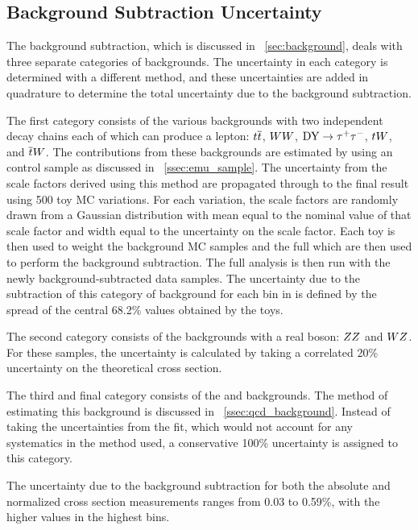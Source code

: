 \subsection{Background Subtraction Uncertainty}
\label{ssec:background_subtraction_uncertainty}

The background subtraction, which is discussed in \SEC~\ref{sec:background},
deals with three separate categories of backgrounds. The uncertainty in
each category is determined with a different method, and these uncertainties
are added in quadrature to determine the total uncertainty due to the
background subtraction.

The first category consists of the various backgrounds with two independent
decay chains each of which can produce a lepton: $t\overline{t}$, $WW$,
$\text{DY} \to \tau^{+} \tau^{-}$, $tW$, and $\overline{t}W$. The contributions from these backgrounds
are estimated by using an \emu control sample as discussed in
\SEC~\ref{ssec:emu_sample}. The uncertainty from the scale factors derived
using this method are propagated through to the final result using 500 toy MC
variations. For each variation, the scale factors are randomly drawn from a
Gaussian distribution with mean equal to the nominal value of that scale factor
and width equal to the uncertainty on the scale factor. Each toy is then used
to weight the background MC samples and the full which are then used to perform
the background subtraction. The full analysis is then run with the newly
background-subtracted data samples. The uncertainty due to the subtraction of
this category of background for each bin in \phistar is defined by the spread
of the central 68.2\% values obtained by the toys.

The second category consists of the backgrounds with a real \Z boson: $ZZ$
and $WZ$. For these samples, the uncertainty is calculated by taking a
correlated 20\% uncertainty on the theoretical cross section.

The third and final category consists of the \QCDjets and \wjets
backgrounds. The method of estimating this background is discussed in
\SEC~\ref{ssec:qcd_background}. Instead of taking the uncertainties from the
fit, which would not account for any systematics in the method used, a
conservative 100\% uncertainty is assigned to this category.

The uncertainty due to the background subtraction for both the absolute and
normalized cross section measurements ranges from 0.03 to 0.59\%, with the
higher values in the highest \phistar bins.


